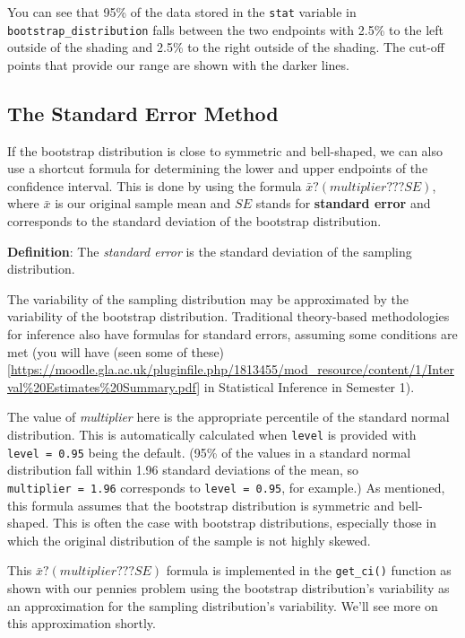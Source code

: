 \documentclass[]{article}
\begin{document}
You can see that 95\% of the data stored in the \texttt{stat} variable
in \texttt{bootstrap\_distribution} falls between the two endpoints with
2.5\% to the left outside of the shading and 2.5\% to the right outside
of the shading. The cut-off points that provide our range are shown with
the darker lines.

\subsection{The Standard Error Method}\label{the-standard-error-method}

If the bootstrap distribution is close to symmetric and bell-shaped, we
can also use a shortcut formula for determining the lower and upper
endpoints of the confidence interval. This is done by using the formula
\(\bar{x}?(multiplier???SE)\), where \(\bar{x}\) is our original sample
mean and \(SE\) stands for \textbf{standard error} and corresponds to
the standard deviation of the bootstrap distribution.

\textbf{Definition}: The \emph{standard error} is the standard deviation
of the sampling distribution.

The variability of the sampling distribution may be approximated by the
variability of the bootstrap distribution. Traditional theory-based
methodologies for inference also have formulas for standard errors,
assuming some conditions are met (you will have (seen some of
these){[}\url{https://moodle.gla.ac.uk/pluginfile.php/1813455/mod_resource/content/1/Interval\%20Estimates\%20Summary.pdf}{]}
in Statistical Inference in Semester 1).

The value of \emph{multiplier} here is the appropriate percentile of the
standard normal distribution. This is automatically calculated when
\texttt{level} is provided with \texttt{level\ =\ 0.95} being the
default. (95\% of the values in a standard normal distribution fall
within 1.96 standard deviations of the mean, so
\texttt{multiplier\ =\ 1.96} corresponds to \texttt{level\ =\ 0.95}, for
example.) As mentioned, this formula assumes that the bootstrap
distribution is symmetric and bell-shaped. This is often the case with
bootstrap distributions, especially those in which the original
distribution of the sample is not highly skewed.

This \(\bar{x}?(multiplier???SE)\) formula is implemented in the
\texttt{get\_ci()} function as shown with our pennies problem using the
bootstrap distribution's variability as an approximation for the
sampling distribution's variability. We'll see more on this
approximation shortly.
\end{document}
